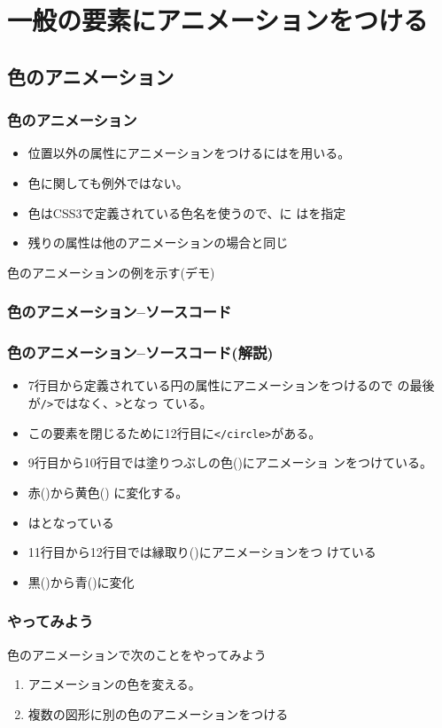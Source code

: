 

\frame{\maketitle}
\section{一般の要素にアニメーションをつける}
\subsection{色のアニメーション}
\begin{frame}[containsverbatim]
 \frametitle{色のアニメーション}
\begin{itemize}
 \item 位置以外の属性にアニメーションをつけるにはを用いる。
 \item 色に関しても例外ではない。
 \item 色はCSS3で定義されている色名を使うので、に
			 はを指定
 \item 残りの属性は他のアニメーションの場合と同じ
\end{itemize}
 色のアニメーションの例を示す(デモ)
\end{frame}
\begin{frame}[containsverbatim]
 \frametitle{色のアニメーション--ソースコード}
\end{frame}
\begin{frame}[containsverbatim]
 \frametitle{色のアニメーション--ソースコード(解説)}
 \begin{itemize}
	\item 7行目から定義されている円の属性にアニメーションをつけるので
				の最後が\texttt{/>}ではなく、\texttt{>}となっ
				ている。
	\item この要素を閉じるために12行目に\texttt{</circle>}がある。
	\item 9行目から10行目では塗りつぶしの色()にアニメーショ
				ンをつけている。
	\item 赤()から黄色()
				に変化する。
	\item {}はとなっている
	\item 11行目から12行目では縁取り()にアニメーションをつ
				けている
	\item 黒()から青()に変化
 \end{itemize}
\end{frame}
\begin{frame}[containsverbatim]
 \frametitle{やってみよう}
 色のアニメーションで次のことをやってみよう
 \begin{enumerate}
  \item アニメーションの色を変える。
  \item 複数の図形に別の色のアニメーションをつける
 \end{enumerate}
\end{frame}

